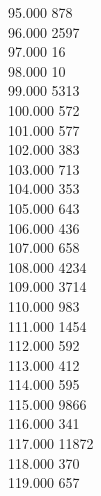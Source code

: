 { 95.000	878 \\
 96.000	2597 \\
 97.000	16 \\
 98.000	10 \\
 99.000	5313 \\
 100.000	572 \\
 101.000	577 \\
 102.000	383 \\
 103.000	713 \\
 104.000	353 \\
 105.000	643 \\
 106.000	436 \\
 107.000	658 \\
 108.000	4234 \\
 109.000	3714 \\
 110.000	983 \\
 111.000	1454 \\
 112.000	592 \\
 113.000	412 \\
 114.000	595 \\
 115.000	9866 \\
 116.000	341 \\
 117.000	11872 \\
 118.000	370 \\
 119.000	657 \\
}
